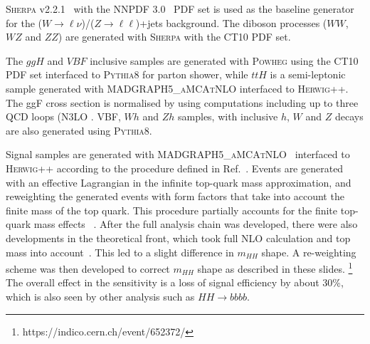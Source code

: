 \textsc{Sherpa} v2.2.1~\cite{Gleisberg:2008ta} with the
\textsc{NNPDF 3.0}~\cite{Lai:2010vv} PDF set is used as the baseline
generator for the ($W \to \ell\nu$)/($Z\to \ell\ell$)+jets background.
The diboson processes ($WW$,
$WZ$ and $ZZ$) are generated with \textsc{Sherpa} with the \textsc{CT10} PDF
set.  

The $ggH$ and $VBF$ inclusive samples are generated with \textsc{Powheg} using
the \textsc{CT10} PDF set interfaced to \textsc{Pythia8} for parton
shower, while $ttH$ is a semi-leptonic sample generated with
\textsc{MADGRAPH5\_aMCAtNLO} interfaced to \textsc{Herwig++}. The ggF cross
section is normalised by using computations including up to three QCD
loops (N3LO \cite{Anastasiou:2016cez}. VBF, $Wh$ and $Zh$ samples,
  with inclusive $h$, $W$ and $Z$ decays
are also generated using \textsc{Pythia8}. 


Signal samples are
generated with \textsc{MADGRAPH5\_aMCAtNLO}~\cite{Alwall:2014hca} interfaced to
\textsc{Herwig++} according to the procedure defined in Ref.~\cite{CP3Paper}. 
Events are generated with an effective
Lagrangian in the infinite top-quark mass approximation, and  reweighting the
generated events  with form factors that take into
account the finite mass of the top quark.  This procedure partially
accounts for the finite top-quark mass effects ~\cite{Degrassi_Ramona}. After the full analysis chain was developed, there were also developments in the theoretical front, which took full NLO calculation and top mass into account~\cite{Borowka:2016ypz, Borowka:2016ehy}. This led to a slight difference in $m_{HH}$ shape. A re-weighting scheme was then developed to correct $m_{HH}$ shape as described in these slides. {\footnote {https://indico.cern.ch/event/652372/}} The overall effect in the sensitivity is a loss of signal efficiency by about 30\%, which is also seen by other analysis such as $HH \rightarrow bbbb$. 

 
